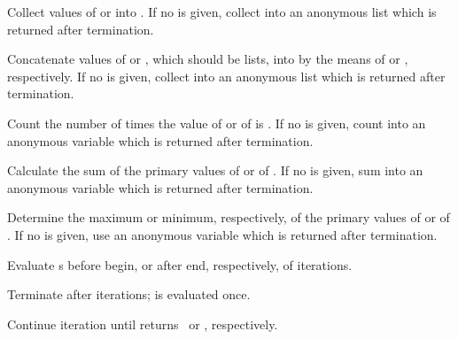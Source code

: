 \begin{LIST}{1cm}
\begin{LIST}{.5cm}
    {
      Collect values of  or  into . If no
       is given, collect into an anonymous list which is
      returned after termination.
    }

    {
      Concatenate values of  or , which should be
      lists, into  by the means of  or ,
      respectively.  If no  is given, collect into an
      anonymous list which is returned after termination. 
    }

    {
      Count the number of times the value of  or of  is \T.
      If no  is given, count into an anonymous variable
      which is returned after termination.
    }

    {
      Calculate the sum of the primary values of  or of .
      If no  is given, sum into an anonymous variable
      which is returned after termination.
    }

    {
      Determine the maximum or minimum, respectively, of the primary values of
       or of . 
      If no  is given, use an anonymous variable
      which is returned after termination.
    }

    {
      Evaluate s before begin, or after end, respectively,
      of iterations.
    }

    {
      Terminate  after  iterations;  is
      evaluated once.
    }

    {
      Continue iteration until  returns \NIL\ or \T,
      respectively.
    }


\end{LIST}
\end{LIST}
